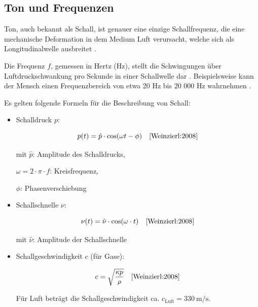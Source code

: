 \begin{center}
\begin{circuitikz}
\end{circuitikz}
	\label{fig:Mikrofonarten1}
\end{center}

\subsection{Ton und Frequenzen} \label{MP34DT05-TonundFrequenz}

Ton, auch bekannt als Schall, ist genauer eine einzige Schallfrequenz, die eine mechanische Deformation in dem Medium Luft verursacht, welche sich als Longitudinalwelle ausbreitet \cite{Weinzierl:2008}.

Die Frequenz $f$, gemessen in Hertz (Hz), stellt die Schwingungen über Luftdruckschwankung pro Sekunde in einer Schallwelle dar \cite{Weinzierl:2008}. Beispielsweise kann der Mensch einen Frequenzbereich von etwa 20 Hz bis 20 000 Hz wahrnehmen \cite{Weinzierl:2008}.

Es gelten folgende Formeln für die Beschreibung von Schall:

\begin{itemize}
	\item Schalldruck $p$:
	
	\begin{equation}
		p(t)=\hat{p} \cdot \cos(\omega t - \phi) 
		\quad \text{\cite{Weinzierl:2008}}
	\end{equation}
	\label{eq: Schalldruck}
	
	mit $\hat{p}$: Amplitude des Schalldrucks,
	
	$\omega = 2 \cdot \pi \cdot  f$: Kreisfrequenz, 
	
	$\phi$: Phasenverschiebung
	
	\item Schallschnelle $\nu$:
	
	\begin{equation}
		\nu(t)=\hat{\nu}\cdot \cos(\omega \cdot  t)
		\quad \text{\cite{Weinzierl:2008}}
	\end{equation}
	\label{eq: Schallschnelle}
	
	mit $\hat{\nu}$: Amplitude der Schallschnelle
	
	\item Schallgeschwindigkeit $c$ (für Gase):
	
	\begin{equation}
		c=\sqrt{\frac{\kappa p}{\rho}}
		\quad \text{\cite{Weinzierl:2008}}
	\end{equation}
	\label{eq: Schallgeschwindigkeit}
	
	\medskip
	
	Für Luft beträgt die Schallgeschwindigkeit ca. $c_{\text{Luft}} = 330\ \text{m/s}$. \cite{Bernstein:2019c}
\end{itemize}

